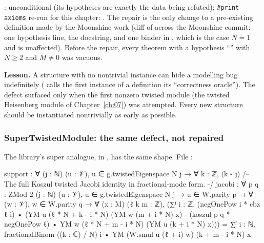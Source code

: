 \begin{status}
: unconditional (its hypotheses are exactly the data being
refuted); \texttt{\#print axioms} re-run for this chapter: . The repair is the only change to a pre-existing definition made by the Moonshine
work (diff of  across the Moonshine commit:
one hypothesis line, the docstring, and one binder in , which is the
case $N=1$ and is unaffected). Before the repair, every theorem with a hypothesis
``'' with $N\ge2$ and $M\neq0$ was vacuous.
\end{status}

\begin{warning}
\textbf{Lesson.} A structure with no nontrivial instance can hide a modelling bug indefinitely
( calls the first instance of a definition its ``correctness oracle''). The
defect surfaced only when the first nonzero twisted module (the twisted Heisenberg module of
Chapter~\ref{ch:07}) was attempted. Every new structure should be instantiated nontrivially as
early as possible.
\end{warning}

\subsubsection{SuperTwistedModule: the same defect, not repaired}\label{ch15:sec:super}

The library's super analogue, in , has the same shape.
File :
\begin{leancode}
  support : ∀ (j : ℕ) (u : 𝒱), u ∈ g.twistedEigenspace N j →
    ∀ k : ℤ, (k - j) %
  /-- The full Koszul twisted Jacobi identity in fractional-mode form. -/
  jacobi : ∀ {p q : ZMod 2} (j : ℕ) (u : 𝒱),
    u ∈ g.twistedEigenspace N j → u ∈ W.parity p →
    ∀ (w : 𝒱), w ∈ W.parity q → ∀ (x : M) (ℓ k m : ℤ),
    (∑ᶠ i : ℤ, (negOnePow i * cbz ℓ i) •
        (YM u (ℓ * N + k - i * N) (YM w (m + i * N) x)
          - (koszul p q * negOnePow ℓ) •
            YM w (ℓ * N + m - i * N) (YM u (k + i * N) x))) =
      ∑ᶠ i : ℕ, fractionalBinom ((k : ℂ) / N) i •
        YM (W.smul u (ℓ + i) w) (k + m - i * N) x
\end{leancode}

